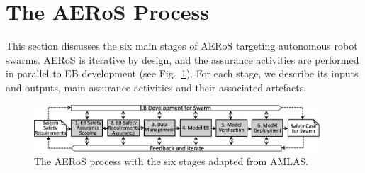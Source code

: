 \documentclass[runningheads]{llncs}
\begin{document}
\section{The AERoS Process}\label{framework}
This section discusses the six main stages of AERoS targeting autonomous robot swarms. AERoS is iterative by design, and the assurance activities are performed in parallel to EB development (see Fig.~\ref{aeros-process}). For each stage, we describe its inputs and outputs, main assurance activities and their associated artefacts. 
\begin{figure}[!t]
	\centering
	\vspace{-2ex}
	\includegraphics[width=0.95\textwidth]{figures/AERoS-Process.pdf}%
	\vspace{-3ex}
	\caption{The AERoS process with the six stages adapted from AMLAS.}%
	\label{aeros-process}
	\vspace{-3ex}
\end{figure}
\end{document}
